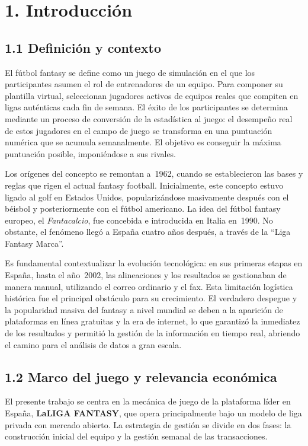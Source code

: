 \section*{1. Introducción}

\subsection{1.1 Definición y contexto}

El fútbol fantasy se define como un juego de simulación en el que los participantes asumen el rol de 
entrenadores de un equipo.
Para componer su plantilla virtual, seleccionan jugadores activos de equipos reales que compiten en 
ligas auténticas cada fin de semana.
El éxito de los participantes se determina mediante un proceso de conversión de la estadística al juego: 
el desempeño real de estos jugadores en el campo de juego se transforma en una puntuación numérica que 
se acumula semanalmente.
El objetivo es conseguir la máxima puntuación posible, imponiéndose a sus rivales.

Los orígenes del concepto se remontan a~1962, cuando se establecieron las bases y reglas que rigen el 
actual fantasy football.
Inicialmente, este concepto estuvo ligado al golf en Estados Unidos, popularizándose masivamente 
después con el béisbol y posteriormente con el fútbol americano.
La idea del fútbol fantasy europeo, el \textit{Fantacalcio}, fue concebida e introducida en Italia 
en~1990.
No obstante, el fenómeno llegó a España cuatro años después, a través de la ``Liga Fantasy Marca''.

Es fundamental contextualizar la evolución tecnológica: en sus primeras etapas en España, hasta el 
año~2002, las alineaciones y los resultados se gestionaban de manera manual, utilizando el correo 
ordinario y el fax.
Esta limitación logística histórica fue el principal obstáculo para su crecimiento.
El verdadero despegue y la popularidad masiva del fantasy a nivel mundial se deben a la aparición de 
plataformas en línea gratuitas y la era de internet, lo que garantizó la inmediatez de los resultados 
y permitió la gestión de la información en tiempo real, abriendo el camino para el análisis de datos 
a gran escala.

\subsection{1.2 Marco del juego y relevancia económica}

El presente trabajo se centra en la mecánica de juego de la plataforma líder en España, 
\textbf{LaLIGA FANTASY}, que opera principalmente bajo un modelo de liga privada con mercado abierto.
La estrategia de gestión se divide en dos fases: la construcción inicial del equipo y la gestión 
semanal de las transacciones.

